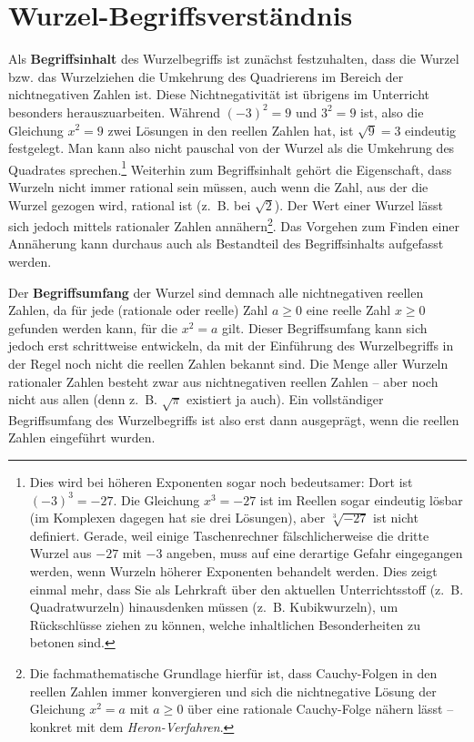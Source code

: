 \documentclass[
  ngerman,
]{scrbook}
\theoremstyle{definition}
\theoremstyle{definition}
\theoremstyle{definition}
\theoremstyle{definition}
\theoremstyle{remark}
\begin{document}
\hypertarget{wurzel-begriffsverstuxe4ndnis}{%
\section{Wurzel-Begriffsverständnis}\label{wurzel-begriffsverstuxe4ndnis}}

Als \textbf{Begriffsinhalt} des Wurzelbegriffs ist zunächst festzuhalten, dass die Wurzel bzw. das Wurzelziehen die Umkehrung des Quadrierens im Bereich der nichtnegativen Zahlen ist. Diese Nichtnegativität ist übrigens im Unterricht besonders herauszuarbeiten. Während \((-3)^2 = 9\) und \(3^2= 9\) ist, also die Gleichung \(x^2 = 9\) zwei Lösungen in den reellen Zahlen hat, ist \(\sqrt{9} = 3\) eindeutig festgelegt. Man kann also nicht pauschal von der Wurzel als die Umkehrung des Quadrates sprechen.\footnote{Dies wird bei höheren Exponenten sogar noch bedeutsamer: Dort ist \((-3)^3 = -27\). Die Gleichung \(x^3 = -27\) ist im Reellen sogar eindeutig lösbar (im Komplexen dagegen hat sie drei Lösungen), aber \(\sqrt[3]{-27}\) ist nicht definiert. Gerade, weil einige Taschenrechner fälschlicherweise die dritte Wurzel aus \(-27\) mit \(-3\) angeben, muss auf eine derartige Gefahr eingegangen werden, wenn Wurzeln höherer Exponenten behandelt werden. Dies zeigt einmal mehr, dass Sie als Lehrkraft über den aktuellen Unterrichtsstoff (z.~B. Quadratwurzeln) hinausdenken müssen (z.~B. Kubikwurzeln), um Rückschlüsse ziehen zu können, welche inhaltlichen Besonderheiten zu betonen sind.} Weiterhin zum Begriffsinhalt gehört die Eigenschaft, dass Wurzeln nicht immer rational sein müssen, auch wenn die Zahl, aus der die Wurzel gezogen wird, rational ist (z.~B. bei \(\sqrt{2}\)). Der Wert einer Wurzel lässt sich jedoch mittels rationaler Zahlen annähern\footnote{Die fachmathematische Grundlage hierfür ist, dass Cauchy-Folgen in den reellen Zahlen immer konvergieren und sich die nichtnegative Lösung der Gleichung \(x^2 = a\) mit \(a\geq 0\) über eine rationale Cauchy-Folge nähern lässt -- konkret mit dem \emph{Heron-Verfahren}.}. Das Vorgehen zum Finden einer Annäherung kann durchaus auch als Bestandteil des Begriffsinhalts aufgefasst werden.

Der \textbf{Begriffsumfang} der Wurzel sind demnach alle nichtnegativen reellen Zahlen, da für jede (rationale oder reelle) Zahl \(a\geq 0\) eine reelle Zahl \(x\geq 0\) gefunden werden kann, für die \(x^2 = a\) gilt. Dieser Begriffsumfang kann sich jedoch erst schrittweise entwickeln, da mit der Einführung des Wurzelbegriffs in der Regel noch nicht die reellen Zahlen bekannt sind. Die Menge aller Wurzeln rationaler Zahlen besteht zwar aus nichtnegativen reellen Zahlen -- aber noch nicht aus allen (denn z.~B. \(\sqrt{\pi}\) existiert ja auch). Ein vollständiger Begriffsumfang des Wurzelbegriffs ist also erst dann ausgeprägt, wenn die reellen Zahlen eingeführt wurden.
\end{document}
